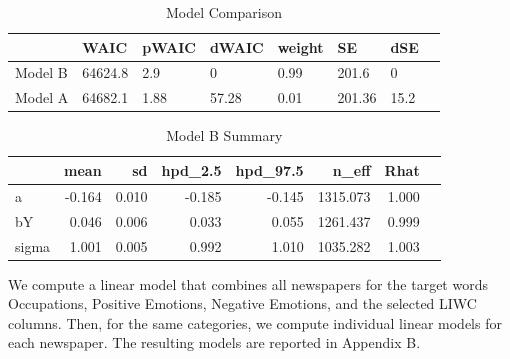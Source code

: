 \documentclass[11pt,a4paper]{article}
\begin{document}
\begin{table}
\tiny
\begin{tabular}{llllllll}
\toprule
{} &     WAIC & pWAIC &  dWAIC & weight &      SE &   dSE \\
\midrule
Model B &  64624.8 &   2.9 &      0 &   0.99 &   201.6 &     0 \\
Model A &  64682.1 &  1.88 &  57.28 &   0.01 &  201.36 &  15.2 \\
\bottomrule
\end{tabular}
\caption{Model Comparison}
\label{table:model1}	
\end{table}

\begin{table}
\tiny
\begin{tabular}{lrrrrrrr}
\toprule
{} &   mean &     sd &  hpd\_2.5 &  hpd\_97.5 &     n\_eff &   Rhat \\
\midrule
a     & -0.164 &  0.010 &       -0.185 &    -0.145 &  1315.073 &  1.000 \\
bY    &  0.046 &  0.006 &       0.033 &     0.055 &  1261.437 &  0.999 \\
sigma &  1.001 &  0.005 &       0.992 &     1.010 &  1035.282 &  1.003 \\
\bottomrule
\end{tabular}
\caption{Model B Summary}
\label{table:model2}
\end{table}

We compute a linear model that combines all newspapers for the target words Occupations, Positive Emotions, Negative Emotions, and the selected LIWC columns. Then, for the same categories, we compute individual linear models for each newspaper. The resulting models are reported in Appendix B.
\end{document}
